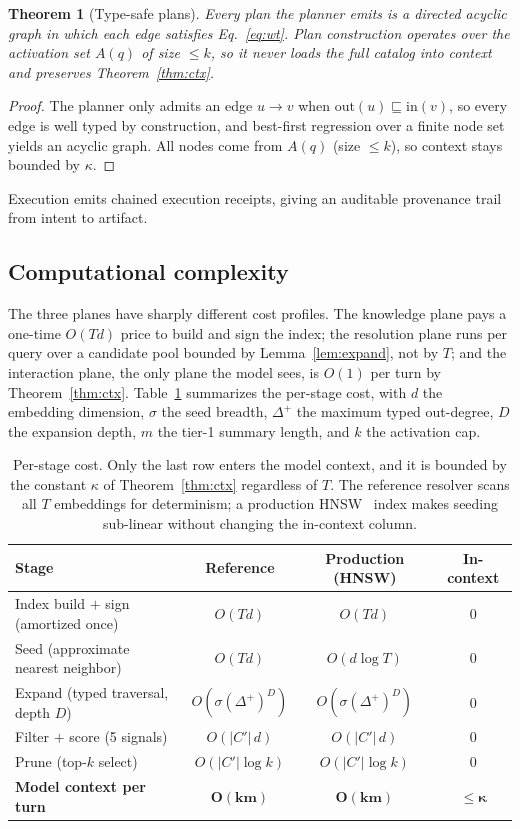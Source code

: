 \documentclass[11pt]{article}
\theoremstyle{plain}
\newtheorem{theorem}{Theorem}
\theoremstyle{definition}
\begin{document}
\begin{theorem}[Type-safe plans]
\label{thm:planner}
Every plan the planner emits is a directed acyclic graph in which each edge
satisfies Eq.~\eqref{eq:wt}. Plan construction operates over the activation set
$A(q)$ of size $\le k$, so it never loads the full catalog into context and
preserves Theorem~\ref{thm:ctx}.
\end{theorem}
\begin{proof}
The planner only admits an edge $u\to v$ when
$\mathrm{out}(u)\sqsubseteq\mathrm{in}(v)$, so every edge is well typed by
construction, and best-first regression over a finite node set yields an acyclic
graph. All nodes come from $A(q)$ (size $\le k$), so context stays bounded by
$\kappa$.
\end{proof}

Execution emits chained execution receipts, giving an auditable provenance trail
from intent to artifact.

\subsection{Computational complexity}
\label{sec:complexity}
The three planes have sharply different cost profiles. The knowledge plane pays a
one-time $O(Td)$ price to build and sign the index; the resolution plane runs per
query over a candidate pool bounded by Lemma~\ref{lem:expand}, not by $T$; and the
interaction plane, the only plane the model sees, is $O(1)$ per turn by
Theorem~\ref{thm:ctx}. Table~\ref{tab:complexity} summarizes the per-stage cost,
with $d$ the embedding dimension, $\sigma$ the seed breadth, $\Delta^{+}$ the
maximum typed out-degree, $D$ the expansion depth, $m$ the tier-1 summary length,
and $k$ the activation cap.

\begin{table}[t]
\centering
\caption{Per-stage cost. Only the last row enters the model context, and it is
bounded by the constant $\kappa$ of Theorem~\ref{thm:ctx} regardless of $T$. The
reference resolver scans all $T$ embeddings for determinism; a production
HNSW~\citep{malkov2018hnsw} index makes seeding sub-linear without changing the
in-context column.}
\label{tab:complexity}
\small
\begin{tabular}{lccc}
\toprule
Stage & Reference & Production (HNSW) & In-context \\
\midrule
Index build $+$ sign (amortized once) & $O(Td)$ & $O(Td)$ & $0$ \\
Seed (approximate nearest neighbor)   & $O(Td)$ & $O(d\log T)$ & $0$ \\
Expand (typed traversal, depth $D$)   & $O(\sigma(\Delta^{+})^{D})$ & $O(\sigma(\Delta^{+})^{D})$ & $0$ \\
Filter $+$ score (5 signals)          & $O(|C'|\,d)$ & $O(|C'|\,d)$ & $0$ \\
Prune (top-$k$ select)                & $O(|C'|\log k)$ & $O(|C'|\log k)$ & $0$ \\
\textbf{Model context per turn}       & $\mathbf{O(km)}$ & $\mathbf{O(km)}$ & $\boldsymbol{\le\kappa}$ \\
\bottomrule
\end{tabular}
\end{table}
\end{document}
